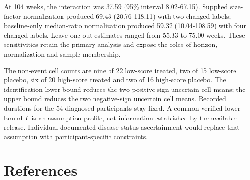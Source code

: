 \documentclass[
  american,
  11pt,
  letterpaper,
]{article}
\begin{document}
At 104 weeks, the interaction was 37.59 (95\% interval 8.02-67.15).
Supplied size-factor normalization produced 69.43 (20.76-118.11) with
two changed labels; baseline-only median-ratio normalization produced
59.32 (10.04-108.59) with four changed labels. Leave-one-out estimates
ranged from 55.33 to 75.00 weeks. These sensitivities retain the primary
analysis and expose the roles of horizon, normalization and sample
membership.

The non-event cell counts are nine of 22 low-score treated, two of 15
low-score placebo, six of 20 high-score treated and two of 16 high-score
placebo. The identification lower bound reduces the two positive-sign
uncertain cell means; the upper bound reduces the two negative-sign
uncertain cell means. Recorded durations for the 54 diagnosed
participants stay fixed. A common verified lower bound \(L\) is an
assumption profile, not information established by the available
release. Individual documented disease-status ascertainment would
replace that assumption with participant-specific constraints.

\section{References}\label{references}
\end{document}
